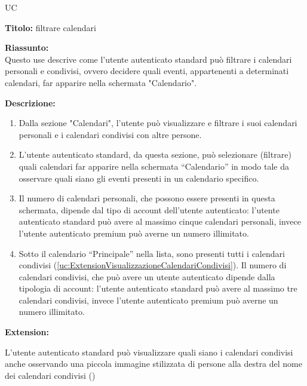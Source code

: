 \begin{listaPersonale}{UC}
    \newpage

    \begin{center}
        
    \end{center}

    \textbf{Titolo:} filtrare calendari

    \textbf{Riassunto:} \\
    Questo use descrive come l'utente autenticato standard può filtrare i calendari personali e condivisi, ovvero decidere  quali eventi, appartenenti a determinati calendari, far apparire nella schermata "Calendario". 

    \textbf{Descrizione:}
    \begin{enumerate}
        \item Dalla sezione "Calendari", l'utente può visualizzare e filtrare i suoi calendari personali e i calendari condivisi con altre persone.
        \item L'utente autenticato standard, da questa sezione, può selezionare (filtrare) quali calendari far apparire nella schermata “Calendario” in modo tale da osservare quali siano gli eventi presenti in un calendario specifico.
        \item Il numero di calendari personali, che possono essere presenti in questa schermata, dipende dal tipo di account dell'utente autenticato: l'utente autenticato standard può avere al massimo cinque calendari personali, invece l'utente autenticato premium può averne un numero illimitato.
        \item Sotto il calendario “Principale” nella lista, sono presenti tutti i calendari condivisi (\ref{uc:ExtensionVisualizzazioneCalendariCondivisi}). Il numero di calendari condivisi, che può avere un utente autenticato dipende dalla tipologia di account: l'utente autenticato standard può avere al massimo tre calendari condivisi, invece l'utente autenticato premium può averne un numero illimitato.
    \end{enumerate}


    \textbf{Extension:}
    \begin{enumerate}[label=\textbf{[extension \arabic{enumii}]}, ref= \textbf{[extension \arabic{enumii}]}]
         L'utente autenticato standard può visualizzare quali siano i calendari condivisi anche osservando una piccola immagine stilizzata di persone alla destra del nome dei calendari condivisi ()
    \end{enumerate}






\end{listaPersonale}
